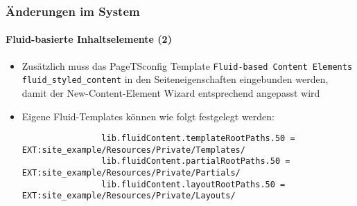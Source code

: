 
\begin{frame}[fragile]
	\frametitle{Änderungen im System}
	\framesubtitle{Fluid-basierte Inhaltselemente (2)}

	\lstset{basicstyle=\tiny\ttfamily}

	\begin{itemize}

		\item Zusätzlich muss das PageTSconfig Template \texttt{Fluid-based Content Elements fluid\_styled\_content}
			in den Seiteneigenschaften eingebunden werden, damit der New-Content-Element Wizard entsprechend
			angepasst wird

		\item Eigene Fluid-Templates können wie folgt festgelegt werden:

			\begin{lstlisting}
				lib.fluidContent.templateRootPaths.50 = EXT:site_example/Resources/Private/Templates/
				lib.fluidContent.partialRootPaths.50 = EXT:site_example/Resources/Private/Partials/
				lib.fluidContent.layoutRootPaths.50 = EXT:site_example/Resources/Private/Layouts/
			\end{lstlisting}

	\end{itemize}

\end{frame}


